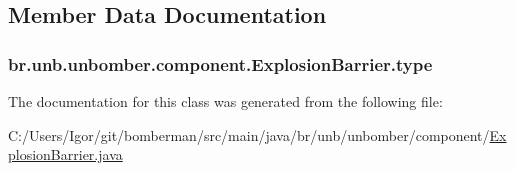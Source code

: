 \subsection{Member Data Documentation}
\hypertarget{classbr_1_1unb_1_1unbomber_1_1component_1_1_explosion_barrier_a6678091bcf2ec0118ad896d6502da892}{
\subsubsection[{type}]{ br.\+unb.\+unbomber.\+component.\+Explosion\+Barrier.\+type\hspace{0.3cm}{\ttfamily [private]}}}\label{classbr_1_1unb_1_1unbomber_1_1component_1_1_explosion_barrier_a6678091bcf2ec0118ad896d6502da892}


The documentation for this class was generated from the following file\+:\begin{DoxyCompactItemize}
\item 
C\+:/\+Users/\+Igor/git/bomberman/src/main/java/br/unb/unbomber/component/\hyperlink{_explosion_barrier_8java}{Explosion\+Barrier.\+java}\end{DoxyCompactItemize}
